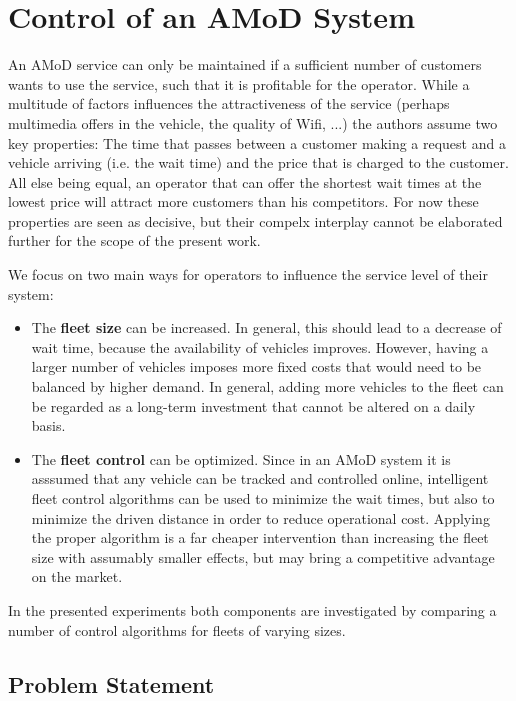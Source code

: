 \section{Control of an AMoD System}
\label{sec:background}

An AMoD service can only be maintained if a sufficient number of customers
wants to use the service, such that it is profitable for the operator. While a multitude
of factors influences the attractiveness of the service (perhaps
multimedia offers in the vehicle, the quality of Wifi, ...) the authors assume
two key properties: The time that passes between a customer making a request
and a vehicle arriving (i.e. the wait time) and the price that is charged to
the customer. All else being equal, an operator that can offer the shortest wait
times at the lowest price will attract more customers than his competitors. For now
these properties are seen as decisive, but their compelx interplay cannot be
elaborated further for the scope of the present work.

We focus on two main ways for operators to influence the service level of their system:

\begin{itemize}
\item The \textbf{fleet size} can be increased. In general, this should lead to
a decrease of wait time, because the availability of vehicles improves. However,
having a larger number of vehicles imposes more fixed costs that would need to be
balanced by higher demand. In general, adding more vehicles to the fleet can be
regarded as a long-term investment that cannot be altered on a daily basis.
\item The \textbf{fleet control} can be optimized. Since in an AMoD system it is
asssumed that any vehicle can be tracked and controlled online, intelligent fleet
control algorithms can be used to minimize the wait times, but also to minimize the
driven distance in order to reduce operational cost. Applying the proper algorithm is a far cheaper intervention than increasing the fleet size with assumably smaller
effects, but may bring a competitive advantage on the market.
\end{itemize}

In the presented experiments both components are investigated by comparing a number
of control algorithms for fleets of varying sizes.

\subsection{Problem Statement}

